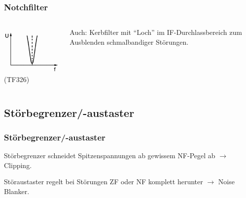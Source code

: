 \begin{frame}
  \frametitle{Notchfilter}

  \begin{columns}
    \begin{center}
      \includegraphics[width=\textwidth,height=.8\textheight,keepaspectratio]{a18/TF326a.png}\\
      {\tiny (TF326)}
    \end{center}

    Auch: Kerbfilter mit ``Loch'' im IF-Durchlassbereich zum Ausblenden
    schmalbandiger Störungen.

  \end{columns}


\end{frame}

\subsection{Störbegrenzer/-austaster}

\begin{frame}
  \frametitle{Störbegrenzer/-austaster}

  Störbegrenzer schneidet Spitzenspannungen ab gewissem NF-Pegel ab
  $\rightarrow$ Clipping.

  \bigskip

  Störaustaster regelt bei Störungen ZF oder NF komplett herunter
  $\rightarrow$ Noise Blanker.


\end{frame}

